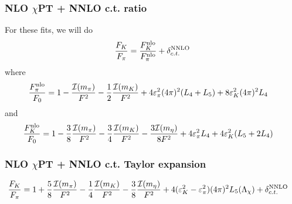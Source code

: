 \documentclass[prd,11pt,tightenlines,preprintnumbers,showpacs,superscriptaddress,notitlepage,nofootinbib,eqsecnum,floatfix,longbibliography]{revtex4-1}
\begin{document}
\subsubsection{NLO $\chi$PT + NNLO c.t. ratio}
For these fits, we will do
\begin{equation}
\frac{F_K}{F_\pi} = \frac{F_K^{\rm nlo}}{F_\pi^{\rm nlo}} + {\delta}_{c.t.}^{\rm NNLO}
\end{equation}
where
\begin{align}
\frac{F_\pi^{\rm nlo}}{F_0} &= 1
	- \frac{{\mathcal I}(m_\pi)}{F^2}
	-\frac{1}{2}\frac{{\mathcal I}(m_K)}{F^2}
	+4 {\varepsilon}_\pi^2 (4\pi)^2 (L_4 + L_5)
	+8 {\varepsilon}_K^2 (4\pi)^2 L_4
\end{align}
and
\begin{align}
\frac{F_K^{\rm nlo}}{F_0} &= 1
	-\frac{3}{8}\frac{{\mathcal I}(m_\pi)}{F^2}
	-\frac{3}{4}\frac{{\mathcal I}(m_K)}{F^2}
	-\frac{3{\mathcal I}(m_\eta)}{8F^2}
	+4{\varepsilon}_\pi^2 L_4 + 4{\varepsilon}_K^2(L_5 + 2L_4)
\end{align}



\subsubsection{NLO $\chi$PT + NNLO c.t. Taylor expansion}
\begin{align}\label{eq:fkfpi_chpt}
\frac{F_K}{F_\pi} &= 1
	+\frac{5}{8} \frac{{\mathcal I}(m_\pi)}{F^2}
	-\frac{1}{4} \frac{{\mathcal I}(m_K)}{F^2}
	-\frac{3}{8} \frac{{\mathcal I}(m_\eta)}{F^2}
	+4({\varepsilon}_K^2 - {\varepsilon}_\pi^2) (4\pi)^2 L_5({\Lambda}_{\chi})
	+ {\delta}_{c.t.}^{\rm NNLO}
\end{align}
\end{document}
